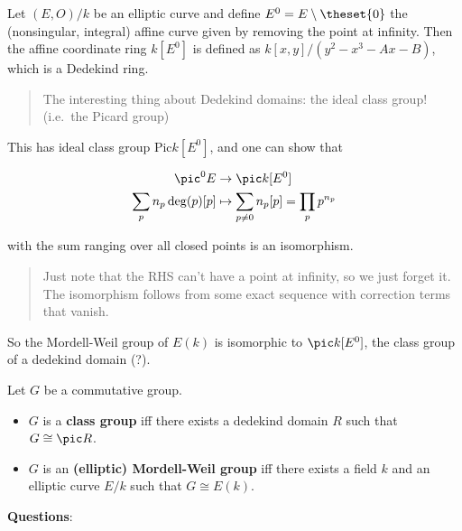 \begin{exercise}[?]

Let \((E, O)/k\) be an elliptic curve and define
\(E^0 = E\setminus \theset{0}\) the (nonsingular, integral) affine curve
given by removing the point at infinity. Then the affine coordinate ring
\(k[E^0]\) is defined as \(k[x, y]/(y^2 -x^3 - Ax - B)\), which is a
Dedekind ring.

\begin{quote}
The interesting thing about Dedekind domains: the ideal class group!
(i.e.~the Picard group)
\end{quote}

This has ideal class group \(\mathrm{Pic} k[E^0]\), and one can show
that

\begin{align*}
\pic^0 E &\to \pic k[E^0] \\
\sum_p n_p \deg(p) [p] &\mapsto \sum_{p\neq 0} n_p [p] = \prod_p p^{n_p}
\end{align*}

with the sum ranging over all closed points is an isomorphism.

\begin{quote}
Just note that the RHS can't have a point at infinity, so we just forget
it. The isomorphism follows from some exact sequence with correction
terms that vanish.
\end{quote}

So the Mordell-Weil group of \(E(k)\) is isomorphic to \(\pic k[E^0]\),
the class group of a dedekind domain (?).

\end{exercise}

\begin{definition}

Let \(G\) be a commutative group.

\begin{itemize}
\tightlist
\item
  \(G\) is a \textbf{class group} iff there exists a dedekind domain
  \(R\) such that \(G \cong \pic R\).
\item
  \(G\) is an \textbf{(elliptic) Mordell-Weil group} iff there exists a
  field \(k\) and an elliptic curve \(E/k\) such that \(G \cong E(k)\).
\end{itemize}

\end{definition}

\textbf{Questions}:

